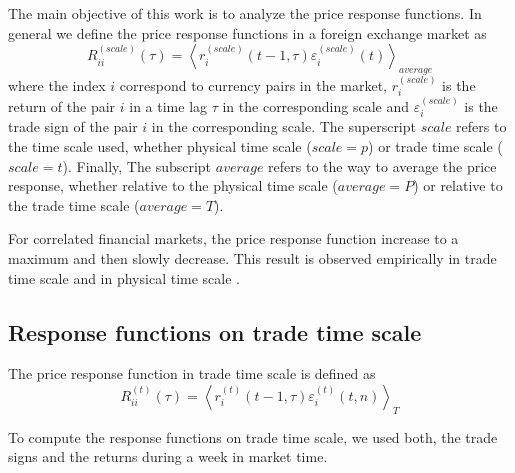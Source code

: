 The main objective of this work is to analyze the price response functions. In
general we define the price response functions in a foreign exchange market as
\begin{equation}\label{eq:response_general}
    R^{\left(scale\right)}_{ii}\left(\tau\right)=\left\langle
    r^{\left(scale\right)}_{i}\left(t-1, \tau\right)
    \varepsilon^{\left(scale\right)}_{i} \left(t\right)\right\rangle_{average}
\end{equation}
where the index $i$ correspond to currency pairs in the market,
$r^{\left(scale\right)}_{i}$ is the return of the pair $i$ in a time lag $\tau$
in the corresponding scale and $\varepsilon^{\left(scale\right)}_{i}$ is the
trade sign of the pair $i$ in the corresponding scale. The superscript $scale$
refers to the time scale used, whether physical time scale
($scale = p$) or trade time scale ($scale = t$). Finally, The subscript
$average$ refers to the way to average the price response, whether relative to
the physical time scale ($average = P$) or relative to the trade time scale
($average = T$).

For correlated financial markets, the price response function increase to a
maximum and then slowly decrease. This result is observed empirically in trade
time scale and in physical time scale
\cite{my_paper_response_financial,Wang_2016_avg}.

\subsection{Response functions on trade time scale}
\label{subsec:response_function_trade}

The price response function in trade time scale is defined as
\cite{my_paper_response_financial}
\begin{equation}\label{eq:response_functions_trade_scale_general}
    R^{\left(t\right)}_{ii}\left(\tau\right)=\left\langle r^{\left(t\right)}
    _{i}\left(t-1,\tau \right)\varepsilon_{i}^{\left(t\right)}
    \left(t, n\right)\right\rangle _{T}
\end{equation}

To compute the response functions on trade time scale, we used both, the trade
signs and the returns during a week in market time.

